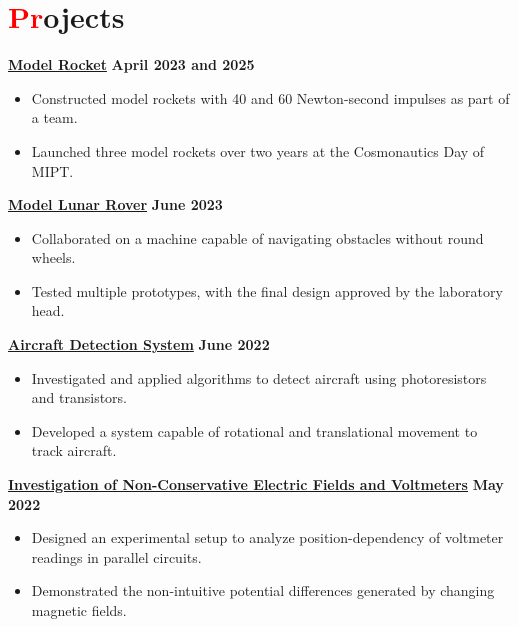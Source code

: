 \documentclass[a4paper,11pt]{article}
\begin{document}
\section{{\textcolor{red}{Pr}ojects}}
    {\href{https://github.com/icarus-imperium/rocket-2025}{\textbf{Model Rocket}}} \hfill \textbf{April 2023 and 2025} \\
    \begin{itemize}
        \vspace{-9pt}
    \item Constructed model rockets with 40 and 60 Newton-second impulses as part of a team.
        \vspace{-9pt}
    \item  Launched three model rockets over two years at the Cosmonautics Day of MIPT.
    \end{itemize}
    \vspace{-9pt}
    {\href{https://github.com/rezaaliasgarirenani/Rover}{\textbf{Model Lunar Rover}}} \hfill \textbf{June 2023}
    \begin{itemize}
        \vspace{-9pt}
    \item  Collaborated on a machine capable of navigating obstacles without round wheels.
        \vspace{-9pt}
    \item  Tested multiple prototypes, with the final design approved by the laboratory head.
    \end{itemize}
    \vspace{-9pt}
    {\href{https://github.com/rezaaliasgarirenani/Aircraft-Detection-System}{\textbf{Aircraft Detection System}}} \hfill \textbf{June 2022}
    \begin{itemize}
        \vspace{-9pt}
    \item  Investigated and applied algorithms to detect aircraft using photoresistors and transistors.
        \vspace{-9pt}
    \item  Developed a system capable of rotational and translational movement to track aircraft.
    \end{itemize}
    \vspace{-9pt}
    {\href{https://github.com/rezaaliasgarirenani/Non-Conservative-Electric-Fields-and-Voltmeters}{\textbf{Investigation of Non-Conservative Electric Fields and Voltmeters}}} \hfill \textbf{May 2022} \\
    \begin{itemize}
        \vspace{-9pt}
    \item  Designed an experimental setup to analyze position-dependency of voltmeter readings in parallel circuits.
        \vspace{-9pt}
    \item  Demonstrated the non-intuitive potential differences generated by changing magnetic fields.
    \end{itemize}
    \vspace{-15pt}
\end{document}
